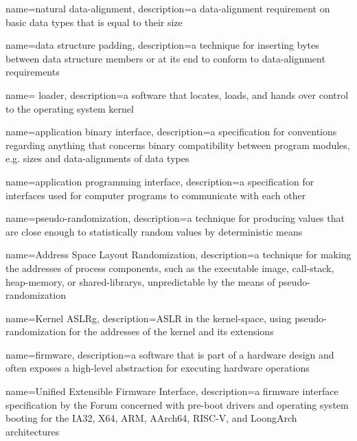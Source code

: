 {
  name={natural \gls{data-alignment}},
  description={a \gls{data-alignment} requirement on basic data types that is equal to their size}
}

{
  name={data structure padding},
  description={a technique for inserting \glspl{byte} between data structure members or at its end to conform to \gls{data-alignment} requirements}
}

{
  name={ loader},
  description={a software that locates, loads, and hands over control to the operating system kernel}
}

{
  name={application binary interface},
  description={a specification for conventions regarding anything that concerns binary compatibility between program modules, e.g. sizes and \glspl{data-alignment} of data types}
}

{
  name={application programming interface},
  description={a specification for interfaces used for computer programs to communicate with each other}
}

{
  name={pseudo-randomization},
  description={a technique for producing values that are close enough to statistically random values by deterministic means}
}

{
  name={Address Space Layout Randomization},
  description={a technique for making the addresses of process components, such as the executable \gls{image}, \gls{call-stack}, \gls{heap-memory}, or \glspl{shared-library}, unpredictable by the means of \gls{pseudo-randomization}}
}

{
  name={Kernel \gls{ASLRg}},
  description={\gls{ASLR} in the \gls{kernel-space}, using \gls{pseudo-randomization} for the addresses of the kernel and its extensions}
}

{
  name={firmware},
  description={a software that is part of a hardware design and often exposes a high-level abstraction for executing hardware operations}
}

{
  name={Unified Extensible Firmware Interface},
  description={a \gls{firmware} interface specification by the  Forum concerned with pre-boot drivers and operating system booting for the IA32, X64, ARM, AArch64, RISC-V, and LoongArch  architectures}
}

